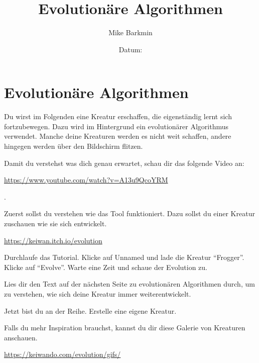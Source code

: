 \documentclass[a4paper]{scrartcl}
\title{Evolutionäre Algorithmen}
\author{Mike Barkmin}
\date{Datum: \hspace{1.5cm}}
\begin{document}
\section*{Evolutionäre Algorithmen}

Du wirst im Folgenden eine Kreatur erschaffen, die eigenständig lernt sich fortzubewegen. Dazu wird im Hintergrund ein evolutionärer Algorithmus verwendet. Manche deine Kreaturen werden es nicht weit schaffen, andere hingegen werden über den Bildschirm flitzen.

\begin{aufgabe}[subtitle=Einführung]
Damit du verstehst was dich genau erwartet, schau dir das folgende Video an:


\url{https://www.youtube.com/watch?v=A13u9QcoYRM}

.

\end{aufgabe}

\begin{aufgabe}[subtitle=Evolution beobachten]

  Zuerst sollst du verstehen wie das Tool funktioniert. Dazu sollst du einer Kreatur zuschauen wie sie sich entwickelt.


  \url{https://keiwan.itch.io/evolution}



  \begin{teilaufgaben}
    \teilaufgabe Durchlaufe das Tutorial.
    \teilaufgabe Klicke auf Unnamed und lade die Kreatur \enquote{Frogger}.
    \teilaufgabe Klicke auf \enquote{Evolve}.
    \teilaufgabe Warte eine Zeit und schaue der Evolution zu.
  \end{teilaufgaben}


\end{aufgabe}

\begin{aufgabe}[subtitle=Hintergrund]
  Lies dir den Text auf der nächsten Seite zu evolutionären Algorithmen durch, um zu verstehen, wie sich deine Kreatur immer weiterentwickelt.
\end{aufgabe}

\begin{aufgabe}[subtitle=Eigene Kreatur]
  Jetzt bist du an der Reihe. Erstelle eine eigene Kreatur.

  Falls du mehr Inspiration brauchst, kannst du dir diese Galerie von Kreaturen anschauen.

  \url{https://keiwando.com/evolution/gifs/}

\end{aufgabe}
\end{document}
